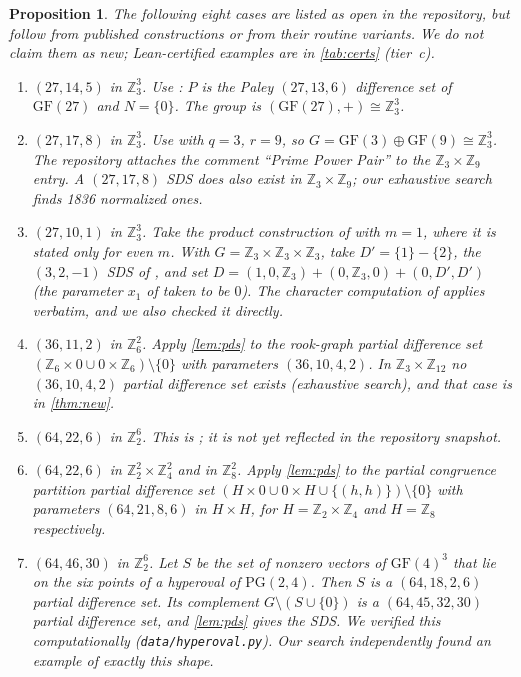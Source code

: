 \documentclass[11pt]{article}
\numberwithin{equation}{section}
\newtheorem{proposition}[theorem]{Proposition}
\theoremstyle{definition}
\theoremstyle{remark}
\newcommand{\Z}{\mathbb Z}
\newcommand{\GF}{\mathrm{GF}}
\begin{document}
\begin{proposition}\label{prop:known}
The following eight cases are listed as open in the repository, but follow from published
constructions or from their routine variants. We do not claim them as new; Lean-certified
examples are in \cref{tab:certs} (tier~c).
\begin{enumerate}
\item $(27,14,5)$ in $\Z_3^3$. Use \cite[Prop.~2.3]{Gordon2023}: $P$ is the Paley $(27,13,6)$
difference set of $\GF(27)$ and $N=\{0\}$. The group is $(\GF(27),+)\cong\Z_3^3$.
\item $(27,17,8)$ in $\Z_3^3$. Use \cite[Thm.~4.1]{Gordon2023} with $q=3$, $r=9$, so
$G=\GF(3)\oplus\GF(9)\cong\Z_3^3$. The repository attaches the comment ``Prime Power Pair'' to
the $\Z_3\times\Z_9$ entry. A $(27,17,8)$ SDS does also exist in $\Z_3\times\Z_9$; our
exhaustive search finds 1836 normalized ones.
\item $(27,10,1)$ in $\Z_3^3$. Take the product construction of \cite[Thm.~4.1]{HeChenGe2024}
with $m=1$, where it is stated only for even $m$. With $G=\Z_3\times\Z_3\times\Z_3$, take
$D'=\{1\}-\{2\}$, the $(3,2,-1)$ SDS of \cite[Prop.~2.2]{Gordon2023}, and set
$D=(1,0,\Z_3)+(0,\Z_3,0)+(0,D',D')$ (the parameter $x_1$ of \cite{HeChenGe2024} taken to be $0$).
The character computation of \cite{HeChenGe2024} applies verbatim, and we also checked it
directly.
\item $(36,11,2)$ in $\Z_6^2$. Apply \cref{lem:pds} to the rook-graph partial difference set
$(\Z_6\times0\cup 0\times\Z_6)\setminus\{0\}$ with parameters $(36,10,4,2)$. In $\Z_3\times\Z_{12}$
no $(36,10,4,2)$ partial difference set exists (exhaustive search), and that case is in
\cref{thm:new}.
\item $(64,22,6)$ in $\Z_2^6$. This is \cite[Thm.~5.3, Ex.~5.4]{HeWu2026}; it is not yet
reflected in the repository snapshot.
\item[6--7.] $(64,22,6)$ in $\Z_2^2\times\Z_4^2$ and in $\Z_8^2$. Apply \cref{lem:pds} to the
partial congruence partition partial difference set $(H\times0\cup0\times H\cup\{(h,h)\})\setminus\{0\}$
with parameters $(64,21,8,6)$ in $H\times H$, for $H=\Z_2\times\Z_4$ and $H=\Z_8$ respectively.
\item[8.] $(64,46,30)$ in $\Z_2^6$. Let $S$ be the set of nonzero vectors of $\GF(4)^3$ that
lie on the six points of a hyperoval of $\mathrm{PG}(2,4)$. Then $S$ is a $(64,18,2,6)$ partial
difference set. Its complement $G\setminus(S\cup\{0\})$ is a $(64,45,32,30)$ partial difference
set, and \cref{lem:pds} gives the SDS. We verified this computationally
(\texttt{data/hyperoval.py}). Our search independently found an example of exactly this
shape.
\end{enumerate}
\end{proposition}
\end{document}
